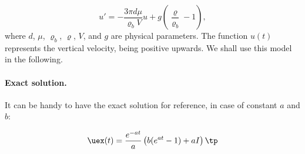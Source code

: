 \documentclass[graybox,envcountchap,sectrefs,final]{svmonodo}
\begin{document}
\begin{equation}
u' = - \frac{3\pi d\mu}{\varrho_b V} u + g\left(\frac{\varrho}{\varrho_b} -1\right),
\label{scale:model:g:spec}
\end{equation}
where $d$, $\mu$, $\varrho_b$, $\varrho$, $V$, and $g$ are physical
parameters. The function $u(t)$ represents the vertical velocity,
being positive upwards.
We shall use this model in the following.

\paragraph{Exact solution.}
It can be handy to have the exact solution for reference, in case
of constant $a$ and $b$:

\[ \uex(t) = \frac{e^{-at}}{a}\left( b(e^{at}-1) + aI\right)
\tp
\]
\end{document}
